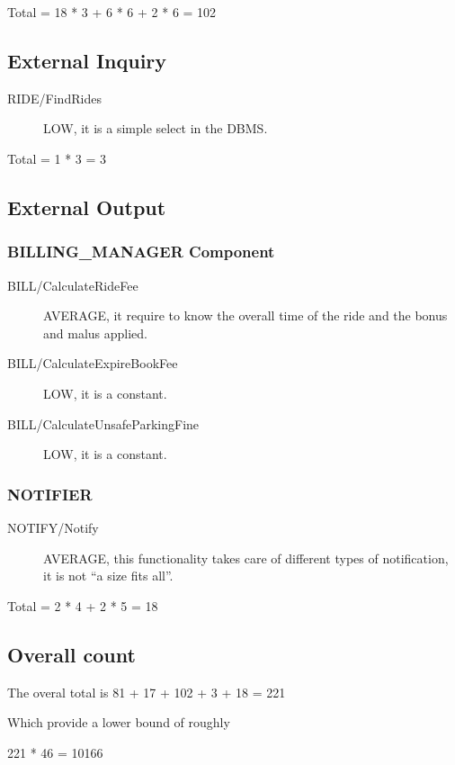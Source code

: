 \documentclass[11pt]{article} %
\begin{document}
Total = 18 * 3 + 6 * 6 + 2 * 6 =  102

\subsection{External Inquiry}

\begin{description}
	\item[RIDE/FindRides] LOW, it is a simple select in the DBMS.
\end{description}

Total = 1 * 3 = 3

\subsection{External Output}

\subsubsection{BILLING\_MANAGER Component}
\begin{description}
	\item[BILL/CalculateRideFee] AVERAGE, it require to know the overall time of the ride and the bonus and malus applied.
	\item[BILL/CalculateExpireBookFee] LOW, it is a constant.
	\item[BILL/CalculateUnsafeParkingFine] LOW, it is a constant.
\end{description}

\subsubsection{NOTIFIER}
\begin{description}
	\item[NOTIFY/Notify] AVERAGE, this functionality takes care of different types of notification, it is not ``a size fits all''.
\end{description}

Total = 2 * 4 + 2 * 5 = 18

\subsection{Overall count}

The overal total is 81 + 17 + 102 + 3 + 18 = 221

Which provide a lower bound of roughly 

221 * 46 = 10166
\end{document}
